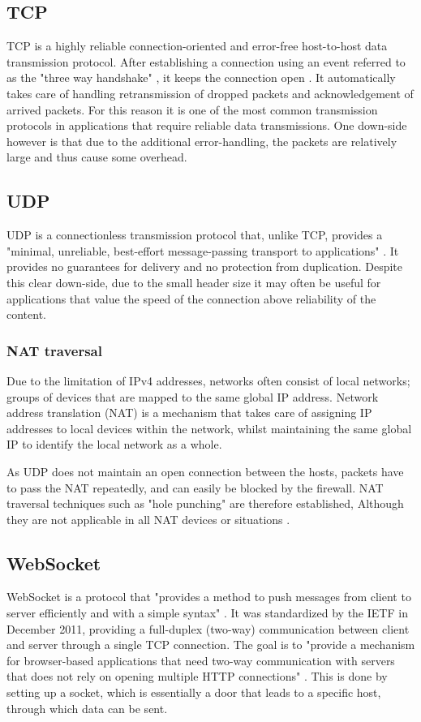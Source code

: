 \documentclass[bsc,frontabs,twoside,singlespacing,parskip,deptreport]{infthesis}     %
\begin{document}
\subsection{TCP}
TCP is a highly reliable connection-oriented and error-free host-to-host data transmission protocol. After establishing a connection using an event referred to as the "three way handshake" \cite{handshake}, it keeps the connection open \cite{tcp_open_connection}. It automatically takes care of handling retransmission of dropped packets and acknowledgement of arrived packets. For this reason it is one of the most common transmission protocols in applications that require reliable data transmissions. One down-side however is that due to the additional error-handling, the packets are relatively large and thus cause some overhead.

\subsection{UDP}
UDP is a connectionless transmission protocol that, unlike TCP, provides a "minimal, unreliable, best-effort message-passing transport to applications" \cite{udp_connectionless}. It provides no guarantees for delivery and no protection from duplication. Despite this clear down-side, due to the small header size it may often be useful for applications that value the speed of the connection above reliability of the content.
\subsubsection{NAT traversal}
Due to the limitation of IPv4 addresses, networks often consist of local networks; groups of devices that are mapped to the same global IP address. Network address translation (NAT) is a mechanism that takes care of assigning IP addresses to local devices within the network, whilst maintaining the same global IP to identify the local network as a whole.

As UDP does not maintain an open connection between the hosts, packets have to pass the NAT repeatedly, and can easily be blocked by the firewall. 
NAT traversal techniques such as "hole punching" are therefore established, Although they are not applicable in all NAT devices or situations \cite{udp_holepunching}.

\subsection{WebSocket}
WebSocket is a protocol that "provides a method to push messages from client to server efficiently and with a simple syntax" \cite{WebSocket}. It was standardized by the IETF in December 2011, providing a full-duplex (two-way) communication between client and server through a single TCP connection. The goal is to "provide a mechanism for browser-based applications that need two-way communication with servers that does not rely on opening multiple HTTP connections" \cite{websocket_communication}. This is done by setting up a socket, which is essentially a door that leads to a specific host, through which data can be sent.
\end{document}
